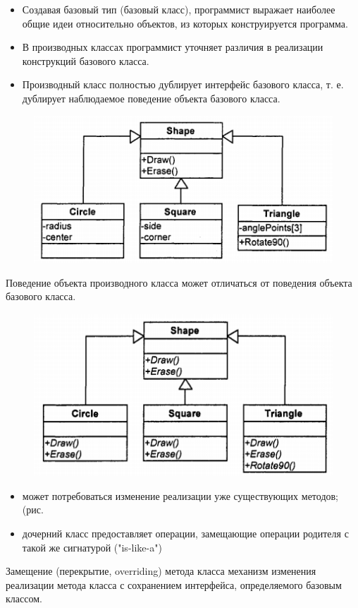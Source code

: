 \documentclass{beamer}
\begin{document}
\begin{frame}
\begin{itemize}
\item Создавая базовый тип (базовый класс), программист выражает наиболее общие идеи относительно объектов, из которых конструируется программа.
\item В производных классах программист уточняет различия в реализации конструкций базового класса.
\item Производный класс полностью дублирует интерфейс базового класса, т. е. дублирует наблюдаемое поведение объекта базового класса. 
\end{itemize}
\begin{figure}[h]
\centering
\includegraphics[scale=0.7]{images/lec04-pic22.png}
\end{figure}
\end{frame}

\begin{frame}
Поведение объекта производного класса может отличаться от поведения объекта базового класса.
\begin{figure}[h]
\centering
\includegraphics[scale=0.6]{images/lec04-pic23.png}
\end{figure}
\begin{itemize}
\item может потребоваться изменение реализации уже существующих методов; (рис.
\item дочерний класс предоставляет операции, замещающие операции родителя с такой же сигнатурой ("is-like-a")
\end{itemize}
\begin{block}{Замещение (перекрытие, overriding) метода класса}
механизм изменения реализации метода класса с сохранением интерфейса, определяемого базовым классом.
\end{block}
\end{frame}
\end{document}
